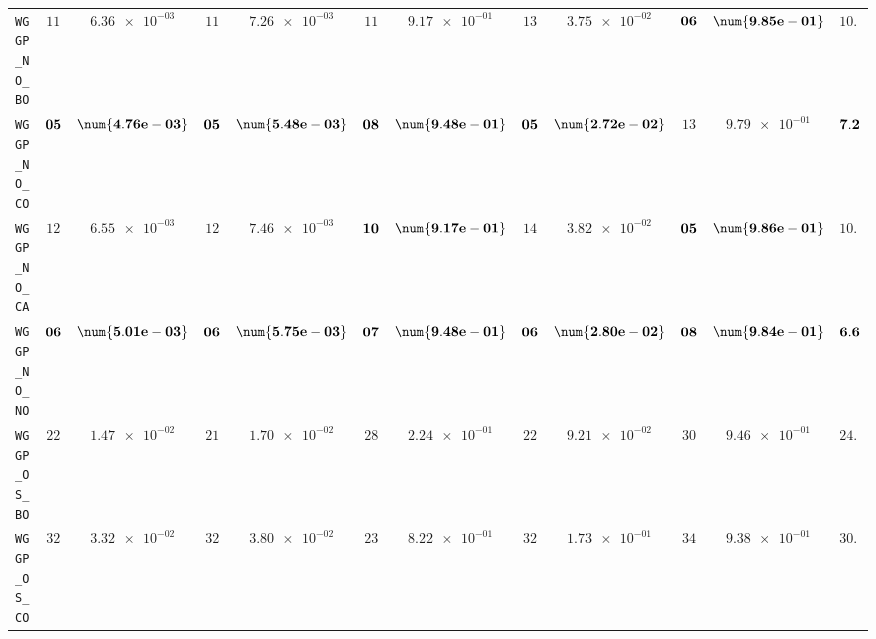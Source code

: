 \begin{table}[H]
\begin{tabularx}{\textwidth}{l||cC|cC|cC|cC|cC||c}
		\texttt{WGGP\_NO\_BO} & $ 11$ & $ \num{6.36e-03}$ & $ 11$ & $ \num{7.26e-03}$ & $ 11$ & $ \num{9.17e-01}$ & $ 13$ & $ \num{3.75e-02}$ & $\bf 06$ & $\bf \num{9.85e-01}$ & $ 10.4$  \\
		\texttt{WGGP\_NO\_CO} & $\bf 05$ & $\bf \num{4.76e-03}$ & $\bf 05$ & $\bf \num{5.48e-03}$ & $\bf 08$ & $\bf \num{9.48e-01}$ & $\bf 05$ & $\bf \num{2.72e-02}$ & $ 13$ & $ \num{9.79e-01}$ & $\bf 7.2$  \\
		\texttt{WGGP\_NO\_CA} & $ 12$ & $ \num{6.55e-03}$ & $ 12$ & $ \num{7.46e-03}$ & $\bf 10$ & $\bf \num{9.17e-01}$ & $ 14$ & $ \num{3.82e-02}$ & $\bf 05$ & $\bf \num{9.86e-01}$ & $ 10.6$  \\
		\texttt{WGGP\_NO\_NO} & $\bf 06$ & $\bf \num{5.01e-03}$ & $\bf 06$ & $\bf \num{5.75e-03}$ & $\bf 07$ & $\bf \num{9.48e-01}$ & $\bf 06$ & $\bf \num{2.80e-02}$ & $\bf 08$ & $\bf \num{9.84e-01}$ & $\bf 6.6$  \\
		\texttt{WGGP\_OS\_BO} & $ 22$ & $ \num{1.47e-02}$ & $ 21$ & $ \num{1.70e-02}$ & $ 28$ & $ \num{2.24e-01}$ & $ 22$ & $ \num{9.21e-02}$ & $ 30$ & $ \num{9.46e-01}$ & $ 24.6$  \\
		\texttt{WGGP\_OS\_CO} & $ 32$ & $ \num{3.32e-02}$ & $ 32$ & $ \num{3.80e-02}$ & $ 23$ & $ \num{8.22e-01}$ & $ 32$ & $ \num{1.73e-01}$ & $ 34$ & $ \num{9.38e-01}$ & $ 30.6$  \\

\end{tabularx}
\end{table}
